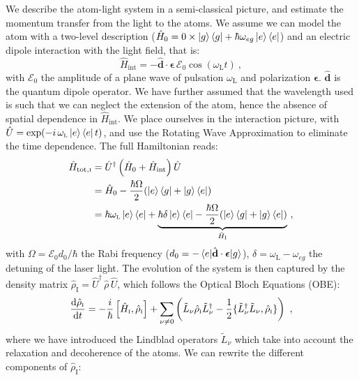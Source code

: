 \documentclass[11pt]{article}
\newcommand{\mathsc}[1]{\mathrm{\scriptscriptstyle {#1}}}
\numberwithin{equation}{section}
\numberwithin{figure}{section}
\begin{document}
We describe the atom-light system in a semi-classical picture, and estimate the momentum transfer from the light to the atoms. We assume we can model the atom with a two-level description ($\hat{H}_0 = 0 \times \ket{g}\bra{g} + \hbar \omega_{eg} \ket{e}\bra{e} $) and an electric dipole interaction with the light field, that is:
%
\begin{equation}
	\hat{H}_\text{int} = - \hat{\mathbf{d}} \cdot \boldsymbol{\epsilon} \, \mathcal{E}_0 \cos(\omega_\mathsc{L} t)~,
\end{equation}
with $\mathcal{E}_0$ the amplitude of a plane wave of pulsation $\omega_\mathsc{L}$ and polarization $\boldsymbol{\epsilon}$. $\hat{\mathbf{d}}$ is the quantum dipole operator. We have further assumed that the wavelength used is such that we can neglect the extension of the atom, hence the absence of spatial dependence in $\hat{H}_\text{int}$. We place ourselves in the interaction picture, with $\hat{U} = \exp(-i\, \omega_\mathsc{L} \ket{e}\bra{e} t)$, and use the Rotating Wave Approximation to eliminate the time dependence. The full Hamiltonian reads:
%
\begin{align}
	\hat{H}_{\text{tot},\mathsc{I}} &= \hat{U}^{\dagger} \left( \hat{H}_0 + \hat{H}_\text{int} \right) \hat{U} \\
	 										 &=  \hat{H}_0  - \frac{\hbar \Omega}{2} (\ket{e} \bra{g}  + \ket{g} \bra{e})~\\
	 										 &=  \hbar \omega_\mathsc{L} \ket{e}\bra{e} + \underbrace{\hbar \delta  \ket{e}\bra{e} - \frac{\hbar \Omega}{2} (\ket{e} \bra{g}  + \ket{g} \bra{e})}_{ \hat{H}_\mathsc{I}}~,
\end{align}
%
with $\Omega= \mathcal{E}_0 d_0/ \hbar$ the Rabi frequency ($d_0= -\mel{e}{\hat{\mathbf{d}} \cdot \boldsymbol{\epsilon}}{g}$), $\delta = \omega_\mathsc{L} - \omega_{eg}$ the detuning of the laser light.
The evolution of the system is then captured by the density matrix $\hat{\rho}_\mathsc{I} = \hat{U}^{\dagger}\, \hat{\rho}\, \hat{U}$, which follows the Optical Bloch Equations (OBE):
%
\begin{equation}
    \label{eq:OBE_tot}
    \dv{\hat{\rho}_\mathsc{I} }{t} = - \frac{i}{\hbar} \left[\hat{H}_\mathsc{I},  \hat{\rho}_\mathsc{I}  \right] + \sum_{\nu \ne 0} \left( \tilde{L}_\nu \hat{\rho}_\mathsc{I}  \tilde{L}_\nu^\dagger - \frac{1}{2} \{ \tilde{L}_\nu^\dagger \tilde{L}_\nu, \hat{\rho}_\mathsc{I}  \} \right)~,
\end{equation}
%
where we have introduced the Lindblad operators $\tilde{L}_\nu$ which take into account the relaxation and decoherence of the atoms. We can rewrite the different components of $\hat{\rho}_\mathsc{I} $:
\end{document}
